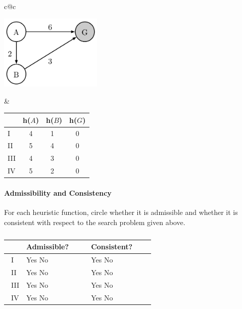 \begin{tabular}{c@{\hspace{0.1\linewidth}}c}

\begin{minipage}{0.45\linewidth}

\centering
\includegraphics[height=1.4in]{figures/heuristic_triangle.pdf}

\end{minipage}

&

\begin{minipage}{0.45\linewidth}

  {\large
  \begin{tabular}{|l|ccc|}
      \hline
      & h($A$) & h($B$) & h($G$) \\ \hline
  I   & 4    & 1 & 0    \\ \hline
  II  & 5    & 4 & 0    \\ \hline
  III & 4    & 3 & 0    \\ \hline
  IV  & 5    & 2 & 0    \\ \hline
  \end{tabular}
  }

\end{minipage}
\end{tabular}


\paragraph*{\bf Admissibility and Consistency}

For each heuristic function, circle whether it is admissible and whether it is consistent with respect to the search problem given above.

\vspace{.5cm}
\begin{table}[!h]
\caption{}
\centering
\begin{tabular}{|m{0.5in}|m{0.8in} m{0in}|m{0.8in} m{0in}|}
   \hline
   ~   & Admissible?                     & ~ & Consistent?                     & ~ \\ [0.15in] \hline
   I   & {Yes} \hfill No  & ~ & Yes \hfill {No}  & ~ \\ [0.15in] \hline
   II  & Yes \hfill {No}  & ~ & Yes \hfill {No}  & ~ \\ [0.15in] \hline
   III & {Yes} \hfill No  & ~ & {Yes} \hfill No  & ~ \\ [0.15in] \hline
   IV  & {Yes} \hfill No  & ~ & Yes \hfill {No}  & ~ \\ [0.15in] \hline
\end{tabular}
\end{table}